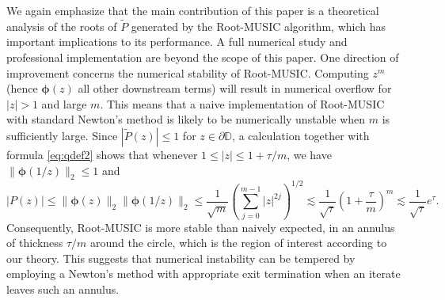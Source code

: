 \documentclass[11pt]{article}
\theoremstyle{definition}
\numberwithin{theorem}{section}
\numberwithin{equation}{section}
\def\D{\mathbb{D}}
\renewcommand{\tilde}{\widetilde}
\newcommand{\bfphi}{{\boldsymbol \phi}}
\numberwithin{equation}{section}
\begin{document}
We again emphasize that the main contribution of this paper is a theoretical analysis of the roots of $\tilde P$ generated by the Root-MUSIC algorithm, which has important implications to its performance. A full numerical study and professional implementation are beyond the scope of this paper. One direction of improvement  concerns the numerical stability of Root-MUSIC. Computing $z^m$ (hence $\bfphi(z)$ all other downstream terms) will result in numerical overflow for $|z|>1$ and large $m$. This means that a naive implementation of Root-MUSIC with standard Newton's method is likely to be numerically unstable when $m$ is sufficiently large. Since $|\tilde P(z)|\leq 1$ for $z\in\partial \D$, a calculation together with formula \eqref{eq:qdef2} shows that whenever $1\leq |z|\leq 1+\tau/m$, we have $\|\bfphi(1/z)\|_2\leq 1$ and
    $$
    |P(z)|
    \leq \|\bfphi(z)\|_2 \|\bfphi(1/z)\|_2 
    \leq \frac 1 {\sqrt m} \left( \sum_{j=0}^{m-1} |z|^{2j} \right)^{1/2}
    \lesssim \frac 1 {\sqrt \tau} \left(1+ \frac \tau m\right)^m
    \lesssim \frac 1 {\sqrt \tau} e^\tau.
    $$ 
    Consequently, Root-MUSIC is more stable than naively expected, in an annulus of thickness $\tau/m$ around the circle, which is the region of interest according to our theory. This suggests that numerical instability can be tempered by employing a Newton's method with appropriate exit termination when an iterate leaves such an annulus.
    
\end{document}
